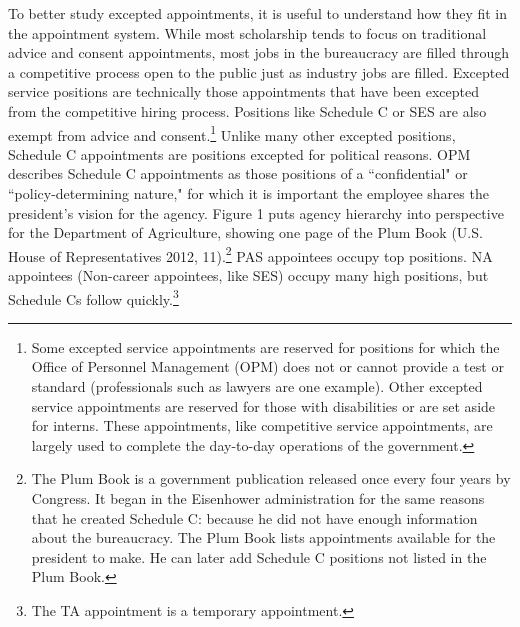 \documentclass[12pt]{article}
\begin{document}
	To better study excepted appointments, it is useful to understand how they fit in the appointment system. While most scholarship tends to focus on traditional advice and consent appointments, most jobs in the bureaucracy are filled through a competitive process open to the public just as industry jobs are filled. Excepted service positions are technically those appointments that have been excepted from the competitive hiring process. Positions like Schedule C or SES are also exempt from advice and consent.\footnote{Some excepted service appointments are reserved for positions for which the Office of Personnel Management (OPM) does not or cannot provide a test or standard (professionals such as lawyers are one example). Other excepted service appointments are reserved for those with disabilities or are set aside for interns. These appointments, like competitive service appointments, are largely used to complete the day-to-day operations of the government.}	Unlike many other excepted positions, Schedule C appointments are positions excepted for political reasons. OPM describes Schedule C appointments as those positions of a ``confidential" or ``policy-determining nature," for which it is important the employee shares the president's vision for the agency. Figure 1 puts agency hierarchy into perspective for the Department of Agriculture, showing one page of the Plum Book (U.S. House of Representatives 2012, 11).\footnote{The Plum Book is a government publication released once every four years by Congress. It began in the Eisenhower administration for the same reasons that he created Schedule C: because he did not have enough information about the bureaucracy. The Plum Book lists appointments available for the president to make. He can later add Schedule C positions not listed in the Plum Book.} PAS appointees occupy top positions. NA appointees (Non-career appointees, like SES) occupy many high positions, but Schedule Cs follow quickly.\footnote{The TA appointment is a temporary appointment.}
	
\end{document}
